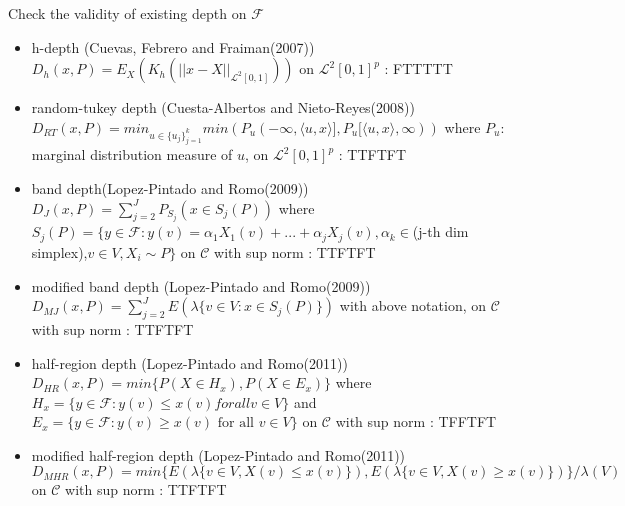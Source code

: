 \documentclass[aspectratio=169,ignorenonframetext,9pt]{beamer}
\theoremstyle{plain}
\theoremstyle{definition}
\begin{document}
\begin{frame}{Check the validity of existing depth on $\mathcal{F}$}
    \begin{itemize}
        \item h-depth (Cuevas, Febrero and Fraiman(2007)) \\
        $D_h(x,P)=E_X(K_h(||x-X||_{\mathcal{L}^2[0,1]}))$ on $\mathcal{L}^2[0,1]^p$ : FTTTTT
        \item random-tukey depth (Cuesta-Albertos and Nieto-Reyes(2008))
        $D_{RT}(x,P)=min_{u\in\{u_j\}_{j=1}^k}min(P_u(-\infty,\langle u,x \rangle], P_u[\langle u,x \rangle,\infty))$
        where $P_u$: marginal distribution measure of $u$, on $\mathcal{L}^2[0,1]^p$ : TTFTFT
        \item band depth(Lopez-Pintado and Romo(2009)) \\
        $D_J(x,P)=\sum_{j=2}^J P_{S_j}(x\in S_j(P))$ where $S_j(P)=\{y\in\mathcal{F} : y(v)=\alpha_1X_1(v)+...+\alpha_jX_j(v), \alpha_k\in$(j-th dim simplex),$ v\in V, X_i\sim P\}$
        on $\mathcal{C}$ with sup norm : TTFTFT
        \item modified band depth (Lopez-Pintado and Romo(2009)) \\
        $D_{MJ}(x,P)=\sum_{j=2}^J E(\lambda \{v\in V : x\in S_j(P)\})$ with above notation,
        on $\mathcal{C}$ with sup norm : TTFTFT
        \item half-region depth (Lopez-Pintado and Romo(2011)) \\
        $D_{HR}(x,P)=min\{P(X\in H_x), P(X\in E_x)\}$ where $H_x=\{y\in\mathcal{F} : y(v)\leq x(v) for all v\in V\}$ and 
        $E_x=\{y\in\mathcal{F} : y(v)\geq x(v) \text{ for all } v\in V\}$ on $\mathcal{C}$ with sup norm : TFFTFT
        \item modified half-region depth (Lopez-Pintado and Romo(2011)) \\
        $D_{MHR}(x,P)=min\{E(\lambda\{v\in V, X(v)\leq x(v)\}), E(\lambda\{v\in V, X(v)\geq x(v)\})\}/\lambda(V)$
        on $\mathcal{C}$ with sup norm : TTFTFT
    \end{itemize}

\end{frame}
\end{document}

